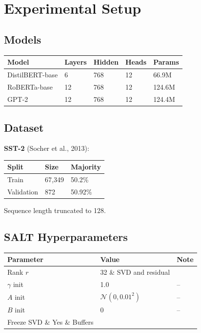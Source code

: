 
\section{Experimental Setup}

\subsection{Models}

\begin{table}[H]
\centering
\small
\begin{tabular}{lllll}
\toprule
\textbf{Model} & \textbf{Layers} & \textbf{Hidden} & \textbf{Heads} & \textbf{Params} \\
\midrule
DistilBERT-base & 6 & 768 & 12 & 66.9M \\
RoBERTa-base & 12 & 768 & 12 & 124.6M \\
GPT-2 & 12 & 768 & 12 & 124.4M \\
\bottomrule
\end{tabular}
\end{table}

\subsection{Dataset}

\textbf{SST-2} (Socher et al., 2013):

\begin{table}[H]
\centering
\small
\begin{tabular}{lll}
\toprule
\textbf{Split} & \textbf{Size} & \textbf{Majority} \\
\midrule
Train & 67,349 & 50.2\% \\
Validation & 872 & 50.92\% \\
\bottomrule
\end{tabular}
\end{table}

Sequence length truncated to 128.

\subsection{SALT Hyperparameters}

\begin{table}[H]
\centering
\small
\begin{tabular}{lll}
\toprule
\textbf{Parameter} & \textbf{Value} & \textbf{Note} \\
\midrule
Rank $r$ & 32 \& SVD and residual \\
$\gamma$ init & 1.0 & -- \\
$A$ init & $\mathcal{N}(0, 0.01^2)$ & -- \\
$B$ init & 0 & -- \\
Freeze SVD \& Yes \& Buffers \\
\bottomrule
\end{tabular}
\end{table}

